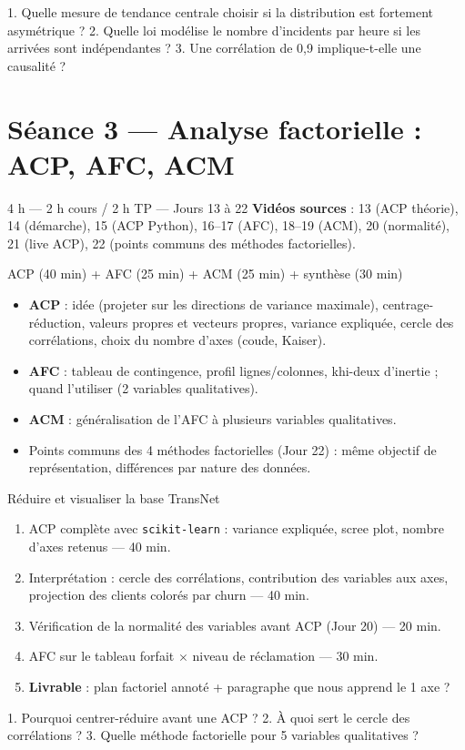 \documentclass[11pt,a4paper]{article}
\begin{document}
\begin{evalbox}
1. Quelle mesure de tendance centrale choisir si la distribution est fortement asymétrique ? 2. Quelle loi modélise le nombre d'incidents par heure si les arrivées sont indépendantes ? 3. Une corrélation de 0,9 implique-t-elle une causalité ?
\end{evalbox}

\section*{Séance 3 — Analyse factorielle : ACP, AFC, ACM}
\begin{seancebox}{4 h — 2 h cours / 2 h TP — Jours 13 à 22}
\textbf{Vidéos sources} : 13 (ACP théorie), 14 (démarche), 15 (ACP Python), 16--17 (AFC), 18--19 (ACM), 20 (normalité), 21 (live ACP), 22 (points communs des méthodes factorielles).
\end{seancebox}
\begin{coursbox}{ACP (40 min) + AFC (25 min) + ACM (25 min) + synthèse (30 min)}
\begin{itemize}[nosep]
\item \textbf{ACP} : idée (projeter sur les directions de variance maximale), centrage-réduction, valeurs propres et vecteurs propres, variance expliquée, cercle des corrélations, choix du nombre d'axes (coude, Kaiser).
\item \textbf{AFC} : tableau de contingence, profil lignes/colonnes, khi-deux d'inertie ; quand l'utiliser (2 variables qualitatives).
\item \textbf{ACM} : généralisation de l'AFC à plusieurs variables qualitatives.
\item Points communs des 4 méthodes factorielles (Jour 22) : même objectif de représentation, différences par nature des données.
\end{itemize}
\end{coursbox}
\begin{tpbox}{Réduire et visualiser la base TransNet}
\begin{enumerate}[nosep]
\item ACP complète avec \texttt{scikit-learn} : variance expliquée, scree plot, nombre d'axes retenus — 40 min.
\item Interprétation : cercle des corrélations, contribution des variables aux axes, projection des clients colorés par churn — 40 min.
\item Vérification de la normalité des variables avant ACP (Jour 20) — 20 min.
\item AFC sur le tableau forfait $\times$ niveau de réclamation — 30 min.
\item \textbf{Livrable} : plan factoriel annoté + paragraphe \og que nous apprend le 1\ier{} axe ? \fg{}
\end{enumerate}
\end{tpbox}
\begin{evalbox}
1. Pourquoi centrer-réduire avant une ACP ? 2. À quoi sert le cercle des corrélations ? 3. Quelle méthode factorielle pour 5 variables qualitatives ?
\end{evalbox}
\end{document}
